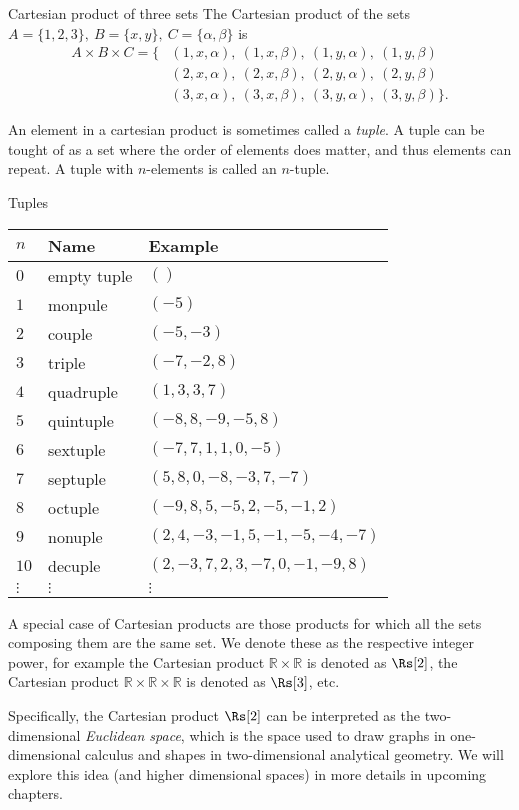 \begin{example}{Cartesian product of three sets}{}
	The Cartesian product of the sets $A=\{1,2,3\},\ B=\{x,y\},\ C=\{\alpha,\beta\}$ is
	\begin{align*}
		A\times B\times C = \{
			&(1,x,\alpha),\ (1,x,\beta),\ (1,y,\alpha),\ (1,y,\beta)\\
			&(2,x,\alpha),\ (2,x,\beta),\ (2,y,\alpha),\ (2,y,\beta)\\
			&(3,x,\alpha),\ (3,x,\beta),\ (3,y,\alpha),\ (3,y,\beta)
		\}.
	\end{align*}
\end{example}

An element in a cartesian product is sometimes called a \emph{tuple}. A tuple can be tought of as a set where the order of elements does matter, and thus elements can repeat. A tuple with $n$-elements is called an $n$-tuple.

\begin{example}{Tuples}{}
	\centering
	\begin{tabular}{lll}
		\toprule
		$n$ & Name & Example\\
		\midrule
		$0$  & empty tuple & $()$\\
		$1$  & monpule	 & $(-5)$\\
		$2$  & couple	 & $(-5,-3)$\\
		$3$  & triple	 & $(-7,-2,8)$\\
		$4$  & quadruple & $(1,3,3,7)$\\
		$5$  & quintuple & $(-8,8,-9,-5,8)$\\
		$6$  & sextuple  & $(-7,7,1,1,0,-5)$\\
		$7$  & septuple  & $(5,8,0,-8,-3,7,-7)$\\
		$8$  & octuple	 & $(-9,8,5,-5,2,-5,-1,2)$\\
		$9$  & nonuple	 & $(2,4,-3,-1,5,-1,-5,-4,-7)$\\
		$10$ & decuple	 & $(2,-3,7,2,3,-7,0,-1,-9,8)$\\ 
		$\vdots$ & $\vdots$ & $\vdots$\\
		\bottomrule
	\end{tabular}
\end{example}

A special case of Cartesian products are those products for which all the sets composing them are the same set. We denote these as the respective integer power, for example the Cartesian product $\mathbb{R}\times\mathbb{R}$ is denoted as $\Rs[2]$, the Cartesian product $\mathbb{R}\times\mathbb{R}\times\mathbb{R}$ is denoted as $\Rs[3]$, etc.

Specifically, the Cartesian product $\Rs[2]$ can be interpreted as the two-dimensional \emph{Euclidean space}, which is the space used to draw graphs in one-dimensional calculus and shapes in two-dimensional analytical geometry. We will explore this idea (and higher dimensional spaces) in more details in upcoming chapters.
